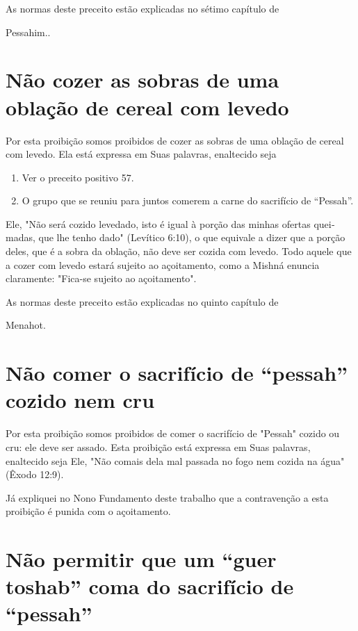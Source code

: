 As normas deste preceito estão explicadas no sétimo capítulo de


Pessahim..

\section{Não cozer as sobras de uma oblação de cereal com levedo}

Por esta proibição somos proibidos de cozer as sobras de uma obla­ção de
cereal com levedo. Ela está expressa em Suas palavras, enaltecido seja


\begin{enumerate}
\def\labelenumi{\arabic{enumi}.}
\setcounter{enumi}{291}
\item
 
 Ver o preceito positivo 57.
 
\item
 
 O grupo que se reuniu para juntos comerem a carne do sacrifício de
 ``Pessah''.
 
\end{enumerate}


Ele, "Não será cozido levedado, isto é igual à porção das minhas ofertas
quei­madas, que lhe tenho dado" (Levítico 6:10), o que equivale a dizer
que a por­ção deles, que é a sobra da oblação, não deve ser cozida com
levedo. Todo aquele que a cozer com levedo estará sujeito ao
açoitamento, como a Mishná enuncia claramente: "Fica-se sujeito ao
açoitamento".


As normas deste preceito estão explicadas no quinto capítulo de


Menahot.

\section{Não comer o sacrifício de ``pessah'' cozido nem cru}

Por esta proibição somos proibidos de comer o sacrifício de "Pes­sah"
cozido ou cru: ele deve ser assado. Esta proibição está expressa em Suas
palavras, enaltecido seja Ele, "Não comais dela mal passada no fogo nem
cozi­da na água" (Êxodo 12:9).

Já expliquei no Nono Fundamento deste trabalho que a contraven­ção a
esta proibição é punida com o açoitamento.

\section{Não permitir que um ``guer toshab'' coma do sacrifício de ``pessah''}

